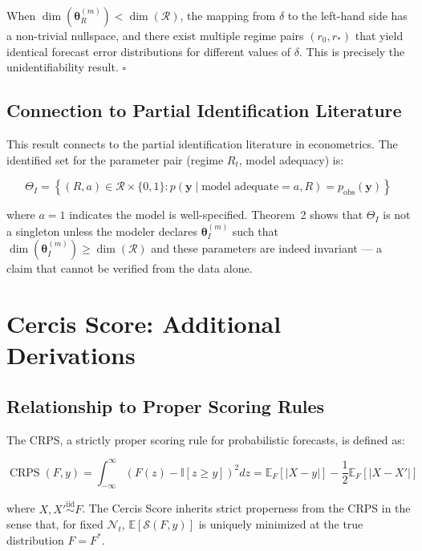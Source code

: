 \documentclass[12pt,a4paper]{article}
\DeclareMathOperator{\CRPS}{CRPS}
\begin{document}
When $\dim(\boldsymbol{\theta}^{(m)}_R) < \dim(\mathcal{R})$, the
mapping from $\delta$ to the left-hand side has a non-trivial
nullspace, and there exist multiple regime pairs $(r_0, r_*)$ that
yield identical forecast error distributions for different values of
$\delta$.  This is precisely the unidentifiability result.  $\square$

\subsection{Connection to Partial Identification Literature}

This result connects to the partial identification literature
\citep{manski2003partial, tamer2010partial} in econometrics.  The
identified set for the parameter pair (regime $R_t$, model adequacy)
is:

\begin{equation}
    \Theta_I = \left\{ (R, a) \in \mathcal{R} \times \{0, 1\} :
    p(\mathbf{y} \mid \text{model adequate} = a, R) =
    p_{\text{obs}}(\mathbf{y}) \right\} \label{eq:identified_set}
\end{equation}

where $a = 1$ indicates the model is well-specified.  Theorem~2 shows
that $\Theta_I$ is not a singleton unless the modeler declares
$\boldsymbol{\theta}^{(m)}_I$ such that
$\dim(\boldsymbol{\theta}^{(m)}_I) \geq \dim(\mathcal{R})$ and these
parameters are indeed invariant --- a claim that cannot be verified
from the data alone.

\section{Cercis Score: Additional Derivations}
\label{app:cercis_derivations}

\subsection{Relationship to Proper Scoring Rules}

The CRPS, a strictly proper scoring rule for probabilistic forecasts,
is defined as:

\begin{equation}
    \CRPS(F, y) = \int_{-\infty}^{\infty} (F(z) - \mathbb{I}[z \geq y])^2 dz
    = \mathbb{E}_F[|X - y|] - \frac{1}{2} \mathbb{E}_F[|X - X'|]
    \label{eq:crps_def}
\end{equation}

where $X, X' \stackrel{\text{iid}}{\sim} F$.  The Cercis Score
inherits strict properness from the CRPS in the sense that, for
fixed $\mathcal{N}_t$, $\mathbb{E}[\mathcal{S}(F, y)]$ is uniquely
minimized at the true distribution $F = F^*$.
\end{document}
